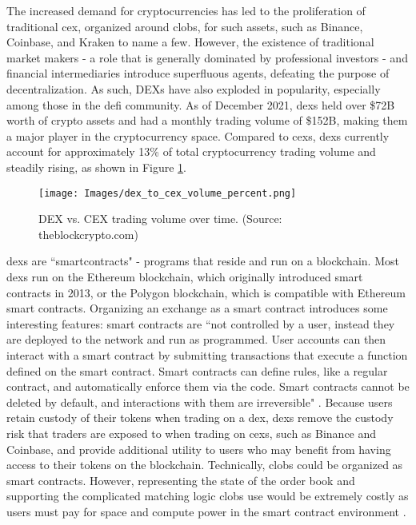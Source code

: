 \documentclass[11pt]{article}
\begin{document}
The increased demand for cryptocurrencies has led to the proliferation of traditional \gls{cex}, organized around \glspl{clob}, for such assets, such as Binance, Coinbase, and Kraken to name a few. However, the existence of traditional market makers - a role that is generally dominated by professional investors - and financial intermediaries introduce superfluous agents, defeating the purpose of decentralization. As such, DEXs have also exploded in popularity, especially among those in the \gls{defi} community. As of December 2021, \glspl{dex} held over \$72B worth of crypto assets and had a monthly trading volume of \$152B, making them a major player in the cryptocurrency space. Compared to \glspl{cex}, \glspl{dex} currently account for approximately 13\% of total cryptocurrency trading volume and steadily rising, as shown in Figure \ref{fig:dex_cex_vol}.

\begin{figure}[H]
    \centering
    \texttt{[image: Images/dex\_to\_cex\_volume\_percent.png]}
    \caption{DEX vs. CEX trading volume over time. (Source: theblockcrypto.com)}
    \label{fig:dex_cex_vol}
\end{figure}

\glspl{dex} are ``\glspl{smartcontract}" - programs that reside and run on a blockchain. Most \glspl{dex} run on the Ethereum blockchain, which originally introduced smart contracts in 2013, or the Polygon blockchain, which is compatible with Ethereum smart contracts. Organizing an exchange as a smart contract introduces some interesting features: smart contracts are ``not controlled by a user, instead they are deployed to the network and run as programmed. User accounts can then interact with a smart contract by submitting transactions that execute a function defined on the smart contract. Smart contracts can define rules, like a regular contract, and automatically enforce them via the code. Smart contracts cannot be deleted by default, and interactions with them are irreversible" \citep*{EthereumSmartContracts}. Because users retain custody of their \glspl{token} when trading on a \gls{dex}, \glspl{dex} remove the custody risk that traders are exposed to when trading on \glspl{cex}, such as Binance and Coinbase, and provide additional utility to users who may benefit from having access to their tokens on the blockchain. Technically, \glspl{clob} could be organized as smart contracts. However, representing the state of the order book and supporting the complicated matching logic \glspl{clob} use would be extremely costly as users must pay for space and compute power in the smart contract environment \citep*{angeris2021analysis}.
\end{document}
